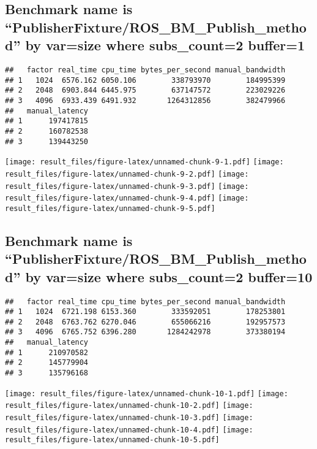 \documentclass[]{article}
\begin{document}
\hypertarget{benchmark-name-is-publisherfixtureros_bm_publish_method-by-varsize-where-subs_count2-buffer1}{%
\subsection{Benchmark name is
``PublisherFixture/ROS\_BM\_Publish\_method'' by var=size where
subs\_count=2
buffer=1}\label{benchmark-name-is-publisherfixtureros_bm_publish_method-by-varsize-where-subs_count2-buffer1}}

\begin{verbatim}
##   factor real_time cpu_time bytes_per_second manual_bandwidth
## 1   1024  6576.162 6050.106        338793970        184995399
## 2   2048  6903.844 6445.975        637147572        223029226
## 3   4096  6933.439 6491.932       1264312856        382479966
##   manual_latency
## 1      197417815
## 2      160782538
## 3      139443250
\end{verbatim}

\texttt{[image: result\_files/figure-latex/unnamed-chunk-9-1.pdf]}
\texttt{[image: result\_files/figure-latex/unnamed-chunk-9-2.pdf]}
\texttt{[image: result\_files/figure-latex/unnamed-chunk-9-3.pdf]}
\texttt{[image: result\_files/figure-latex/unnamed-chunk-9-4.pdf]}
\texttt{[image: result\_files/figure-latex/unnamed-chunk-9-5.pdf]}

\hypertarget{benchmark-name-is-publisherfixtureros_bm_publish_method-by-varsize-where-subs_count2-buffer10}{%
\subsection{Benchmark name is
``PublisherFixture/ROS\_BM\_Publish\_method'' by var=size where
subs\_count=2
buffer=10}\label{benchmark-name-is-publisherfixtureros_bm_publish_method-by-varsize-where-subs_count2-buffer10}}

\begin{verbatim}
##   factor real_time cpu_time bytes_per_second manual_bandwidth
## 1   1024  6721.198 6153.360        333592051        178253801
## 2   2048  6763.762 6270.046        655066216        192957573
## 3   4096  6765.752 6396.280       1284242978        373380194
##   manual_latency
## 1      210970582
## 2      145779904
## 3      135796168
\end{verbatim}

\texttt{[image: result\_files/figure-latex/unnamed-chunk-10-1.pdf]}
\texttt{[image: result\_files/figure-latex/unnamed-chunk-10-2.pdf]}
\texttt{[image: result\_files/figure-latex/unnamed-chunk-10-3.pdf]}
\texttt{[image: result\_files/figure-latex/unnamed-chunk-10-4.pdf]}
\texttt{[image: result\_files/figure-latex/unnamed-chunk-10-5.pdf]}
\end{document}
